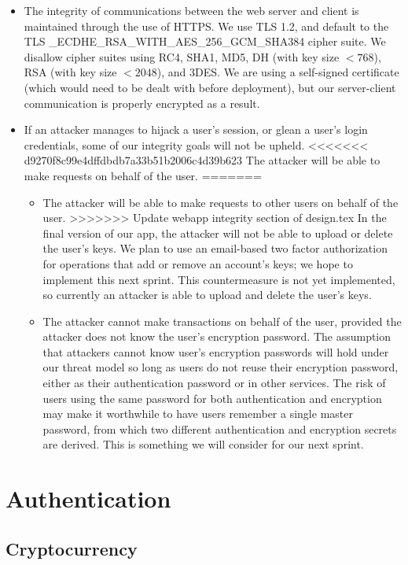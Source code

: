 \documentclass[a4paper,12pt]{article}
\begin{document}
\begin{itemize}
\item The integrity of communications between the web server and client is maintained through the use of HTTPS. We use TLS 1.2, and default to the TLS \_ECDHE\_RSA\_WITH\_AES\_256\_GCM\_SHA384 cipher suite.
We disallow cipher suites using RC4, SHA1, MD5, DH (with key size $< 768$), RSA (with key size $< 2048$), and 3DES. We are using a self-signed certificate (which would need to be dealt with before deployment), but our server-client communication is properly encrypted as a result.
\item If an attacker manages to hijack a user's session, or glean a user's login credentials, some of our integrity goals will not be upheld.
<<<<<<< d9270f8c99e4dffdbdb7a33b51b2006c4d39b623
The attacker will be able to make requests on behalf of the user.
=======
\begin{itemize}
\item The attacker will be able to make requests to other users on behalf of the user.
>>>>>>> Update webapp integrity section of design.tex
In the final version of our app, the attacker will not be able to upload or delete the user's keys.
We plan to use an email-based two factor authorization for operations that add or remove an account's keys; we hope to implement this next sprint.
This countermeasure is not yet implemented, so currently an attacker is able to upload and delete the user's keys.
\item The attacker cannot make transactions on behalf of the user, provided the attacker does not know the user's encryption password.
The assumption that attackers cannot know user's encryption passwords will hold under our threat model so long as users do not reuse their encryption password, either as their authentication password or in other services.
The risk of users using the same password for both authentication and encryption may make it worthwhile to have users remember a single master password, from which two different authentication and encryption secrets are derived.
This is something we will consider for our next sprint.
\end{itemize}
\end{itemize}

\section{Authentication}

\subsection{Cryptocurrency}
\end{document}
